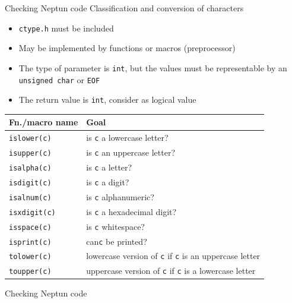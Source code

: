\documentclass[usenames,dvipsnames,aspectratio=169]{beamer}
\begin{document}
\begin{frame}{Checking Neptun code}
  Classification and conversion of characters
  \begin{itemize}
    \item \texttt{ctype.h} must be included
    \item May be implemented by functions or macros (preprocessor)
    \item The type of parameter is \texttt{int}, but the values must be representable by an \texttt{unsigned char} or \texttt{EOF}
    \item The return value is \texttt{int}, consider as logical value
  \end{itemize}
  \footnotesize
  \begin{center}
    \begin{tabular}{ll}
    Fn./macro name & Goal\\ \hline
    \texttt{islower(c)} & is \texttt{c} a lowercase letter?\\
    \texttt{isupper(c)} & is \texttt{c} an uppercase letter?\\
    \texttt{isalpha(c)} & is \texttt{c} a letter?\\
    \texttt{isdigit(c)} & is \texttt{c} a digit?\\
    \texttt{isalnum(c)} & is \texttt{c} alphanumeric?\\
    \texttt{isxdigit(c)} & is \texttt{c} a hexadecimal digit?\\
    \texttt{isspace(c)} & is \texttt{c} whitespace?\\
    \texttt{isprint(c)} & can\texttt{c} be printed?\\
    \texttt{tolower(c)} & lowercase version of \texttt{c} if \texttt{c} is an uppercase letter\\
    \texttt{toupper(c)} & uppercase version of \texttt{c} if \texttt{c} is a lowercase letter
    \end{tabular}
  \end{center}
\end{frame}

\begin{frame}{Checking Neptun code}
    \begin{exampleblock}{}
    \tiny
    
  \end{exampleblock}
\end{frame}
\end{document}
